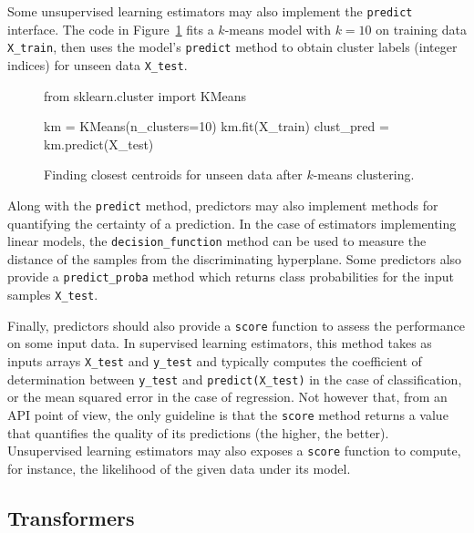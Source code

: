 \documentclass{llncs}
\begin{document}
Some unsupervised learning
estimators may also implement the \texttt{predict} interface.
The code in Figure~\ref{kmeans-predict} fits a $k$-means model with $k=10$
on training data \texttt{X\_train},
then uses the model's \texttt{predict} method
to obtain cluster labels (integer indices) for unseen data \texttt{X\_test}.

\begin{figure}[h]
\begin{pythoncode}
from sklearn.cluster import KMeans

km = KMeans(n_clusters=10)
km.fit(X_train)
clust_pred = km.predict(X_test)
\end{pythoncode}
\caption{Finding closest centroids for unseen data after $k$-means clustering.}
\label{kmeans-predict}
\end{figure}

Along with the \texttt{predict} method, predictors may also implement methods
for quantifying the certainty of a prediction. In the case of estimators
implementing linear models, the \texttt{decision\_function} method can be used
to measure the distance of the samples from the discriminating hyperplane. Some
predictors also provide a \texttt{predict\_proba} method which returns
class probabilities for the input samples \texttt{X\_test}.

Finally, predictors should also provide a \texttt{score} function to assess the
performance on some input data. In supervised learning estimators, this method
takes as inputs arrays \texttt{X\_test} and \texttt{y\_test} and typically
computes the coefficient of determination between \texttt{y\_test} and
\texttt{predict(X\_test)} in the case of classification, or the mean squared
error in the case of regression. Not however that, from an API point of view,
the only guideline is that the \texttt{score} method returns a value
that quantifies the quality of its predictions (the higher, the better).
Unsupervised learning estimators may also exposes a \texttt{score} function
to compute, for instance, the likelihood of the given data under its model.

\subsection{Transformers}
\end{document}
